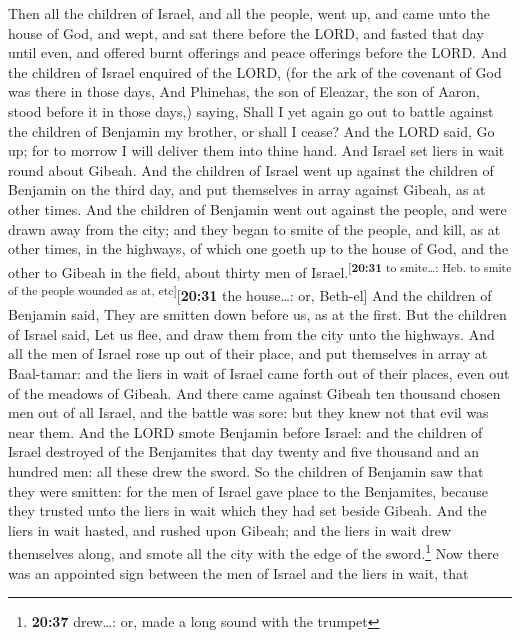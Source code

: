  Then all the children of Israel, and all the people,
went up, and came unto the house of God, and wept, and sat there before
the LORD, and fasted that day until even, and offered burnt offerings
and peace offerings before the LORD.  And the children of
Israel enquired of the LORD, (for the ark of the covenant of God was
there in those days,  And Phinehas, the son of Eleazar,
the son of Aaron, stood before it in those days,) saying, Shall I yet
again go out to battle against the children of Benjamin my brother, or
shall I cease? And the LORD said, Go up; for to morrow I will deliver
them into thine hand.  And Israel set liers in wait round
about Gibeah.  And the children of Israel went up against
the children of Benjamin on the third day, and put themselves in array
against Gibeah, as at other times.  And the children of
Benjamin went out against the people, and were drawn away from the city;
and they began to smite of the people, and kill, as at other times, in
the highways, of which one goeth up to the house of God, and the other
to Gibeah in the field, about thirty men of
Israel.\textsuperscript{{[}\textbf{20:31} to smite\ldots: Heb. to smite
of the people wounded as at, etc{]}}{[}\textbf{20:31} the house\ldots:
or, Beth-el{]}  And the children of Benjamin said, They
are smitten down before us, as at the first. But the children of Israel
said, Let us flee, and draw them from the city unto the highways.
 And all the men of Israel rose up out of their place,
and put themselves in array at Baal-tamar: and the liers in wait of
Israel came forth out of their places, even out of the meadows of
Gibeah.  And there came against Gibeah ten thousand
chosen men out of all Israel, and the battle was sore: but they knew not
that evil was near them.  And the LORD smote Benjamin
before Israel: and the children of Israel destroyed of the Benjamites
that day twenty and five thousand and an hundred men: all these drew the
sword.  So the children of Benjamin saw that they were
smitten: for the men of Israel gave place to the Benjamites, because
they trusted unto the liers in wait which they had set beside Gibeah.
 And the liers in wait hasted, and rushed upon Gibeah;
and the liers in wait drew themselves along, and smote all the city with
the edge of the sword.\footnote{\textbf{20:37} drew\ldots: or, made a
  long sound with the trumpet}  Now there was an
appointed sign between the men of Israel and the liers in wait, that
